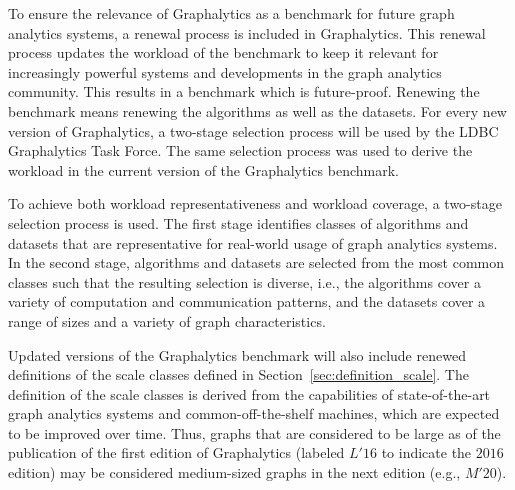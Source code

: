 To ensure the relevance of Graphalytics as a benchmark for future graph analytics systems, a renewal process is included in Graphalytics. This renewal process updates the workload of the benchmark to keep it relevant for increasingly powerful systems and developments in the graph analytics community. This results in a benchmark which is future-proof. Renewing the benchmark means renewing the algorithms as well as the datasets. For every new version of Graphalytics, a two-stage selection process will be used by the LDBC Graphalytics Task Force. The same selection process was used to derive the workload in the current version of the Graphalytics benchmark.

To achieve both workload representativeness and workload coverage, a two-stage selection process is used.  The first stage identifies classes of algorithms and datasets that are representative for real-world usage of graph analytics systems. In the second stage, algorithms and datasets are selected from the most common classes such that the resulting selection is diverse, i.e., the algorithms cover a variety of computation and communication patterns, and the datasets cover a range of sizes and a variety of graph characteristics.

Updated versions of the Graphalytics benchmark will also include renewed definitions of the scale classes defined in Section~\ref{sec:definition_scale}. The definition of the scale classes is derived from the capabilities of state-of-the-art graph analytics systems and common-off-the-shelf machines, which are expected to be improved over time. Thus, graphs that are considered to be large as of the publication of the first edition of Graphalytics (labeled $L'16$ to indicate the $2016$ edition) may be considered medium-sized graphs in the next edition (e.g., $M'20$).

